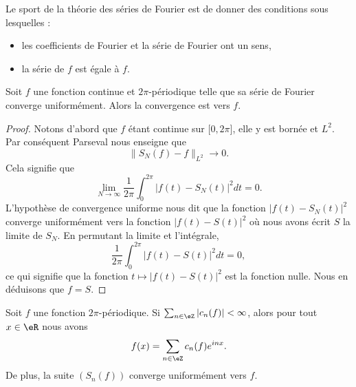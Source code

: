Le sport de la théorie des séries de Fourier est de donner des conditions sous lesquelles :
\begin{itemize}
	\item les coefficients de Fourier et la série de Fourier ont un sens,
	\item la série de \( f\) est égale à \( f\).
\end{itemize}

\begin{proposition}  \label{PropmrLfGt}
	Soit \( f\) une fonction continue et \( 2\pi\)-périodique telle que sa série de Fourier converge uniformément. Alors la convergence est vers \( f\).
\end{proposition}

\begin{proof}
	Notons d'abord que \( f\) étant continue sur \(\mathopen[ 0 , 2\pi \mathclose]\), elle y est bornée et \( L^2\). Par conséquent Parseval nous enseigne que
	\begin{equation}
		\| S_N(f)-f \|_{L^2}\to 0.
	\end{equation}
	Cela signifie que
	\begin{equation}
		\lim_{N\to \infty} \frac{1}{ 2\pi }\int_{0}^{2\pi}| f(t)-S_N(t) |^2dt=0.
	\end{equation}
	L'hypothèse de convergence uniforme nous dit que la fonction \( | f(t)-S_N(t) |^2\) converge uniformément vers la fonction \( | f(t)-S(t) |^2\) où nous avons écrit \( S\) la limite de \( S_N\). En permutant la limite et l'intégrale,
	\begin{equation}
		\frac{1}{ 2\pi }\int_0^{2\pi}| f(t)-S(t) |^2dt=0,
	\end{equation}
	ce qui signifie que la fonction \( t\mapsto | f(t)-S(t) |^2\) est la fonction nulle. Nous en déduisons que \( f=S\).
\end{proof}

\begin{proposition}     \label{PropSgvPab}
	Soit \( f\) une fonction \( 2\pi\)-périodique. Si \( \sum_{n\in \eZ}| c_n(f) |<\infty\), alors pour tout \( x\in \eR\) nous avons
	\begin{equation}
		f(x)=\sum_{n\in \eZ}c_n(f) e^{inx}.
	\end{equation}
	De plus, la suite \( (S_n(f))\) converge uniformément vers \( f\).
\end{proposition}

